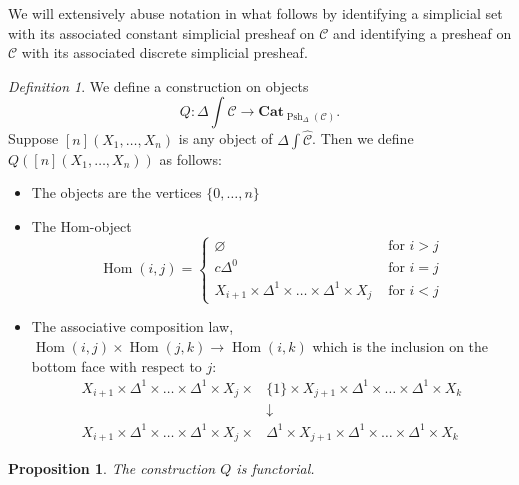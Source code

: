 \documentclass[leqno]{article}
\numberwithin{equation}{subsection}
\theoremstyle{plain}   %
\newtheorem{prop}[equation]{Proposition}
\theoremstyle{remark}
\newtheorem{defn}[equation]{Definition}
\theoremstyle{plain}
\newcommand{\Cat}{\ensuremath{\mathbf{Cat}}}
\DeclareMathOperator{\Hom}{Hom}
\newcommand{\psh}[1]{\ensuremath{\widehat{#1}}}
\providecommand{\C}{}
\renewcommand{\C}{\ensuremath{\mathcal{C}}}
\newcommand{\spsh}{\ensuremath{\operatorname{Psh}_\Delta(\mathcal{C})}}
\begin{document}
We will extensively abuse notation in what follows by identifying a simplicial set with its associated constant simplicial presheaf on \(\C\) and identifying a presheaf on \(\C\) with its associated discrete simplicial presheaf.
\begin{defn}
	We define a construction on objects \[Q:\Delta\int\psh{\C}\to \Cat_{\spsh}.\] Suppose \([n](X_1,\dots, X_n)\) is any object of \(\Delta\int\psh{\C}\). Then we define \(Q([n](X_1,\dots,X_n))\) as follows:
	\begin{itemize}
		\item The objects are the vertices \(\{0,\dots,n\}\)
		\item The Hom-object
		      \[\Hom(i,j)=
			      \begin{cases}
				      \varnothing                                                & \text{ for } i>j \\
				      c\Delta^0                                                & \text{ for } i=j \\
				      X_{i+1} \times \Delta^1 \times \dots \times \Delta^1 \times X_j & \text{ for } i<j
			      \end{cases}
		      \]
		\item The associative composition law, \(\Hom(i,j)\times \Hom(j,k)\to \Hom(i,k)\) which is the inclusion on the bottom face with respect to \(j\):
		      \begin{align*}
			      X_{i+1}\times \Delta^1\times\dots\times\Delta^1\times X_j \times & \{1\}\times X_{j+1} \times \Delta^1\times\dots\times\Delta^1\times X_k    \\
			                                                                       & \downarrow                                                                \\
			      X_{i+1}\times \Delta^1\times\dots\times\Delta^1\times X_j\times  & \Delta^1\times X_{j+1} \times \Delta^1\times\dots\times\Delta^1\times X_k
		      \end{align*}
	\end{itemize}
\end{defn}
\begin{prop} The construction \(Q\) is functorial.
\end{prop}
\end{document}
